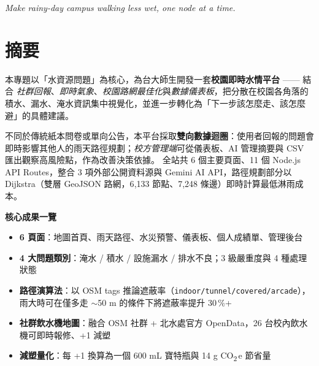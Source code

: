 \documentclass[11pt,a4paper]{article}
\begin{document}
\begin{titlepage}
\vfill


\vspace{0.3cm}
{\color{mute}\small \textit{Make rainy-day campus walking less wet, one node at a time.}}
\vspace{0.5cm}
\end{titlepage}

\section{摘要}

本專題以「水資源問題」為核心，為台大師生開發一套\textbf{校園即時水情平台} —— 結合
\emph{社群回報}、\emph{即時氣象}、\emph{校園路網最佳化}與\emph{數據儀表板}，把分散在校園各角落的積水、漏水、淹水資訊集中視覺化，並進一步轉化為「下一步該怎麼走、該怎麼避」的具體建議。

不同於傳統紙本問卷或單向公告，本平台採取\textbf{雙向數據迴圈}：使用者回報的問題會即時影響其他人的雨天路徑規劃；\emph{校方管理端}可從儀表板、AI 管理摘要與 CSV 匯出觀察高風險點，作為改善決策依據。
全站共 6 個主要頁面、11 個 Node.js API Routes，整合 3 項外部公開資料源與 Gemini AI API，路徑規劃部分以 Dijkstra（雙層 GeoJSON 路網，6{,}133 節點、7{,}248 條邊）即時計算最低淋雨成本。

\begin{infobox}
\textbf{\color{brandDeep}核心成果一覽}
\begin{itemize}
\item \textbf{6 頁面}：地圖首頁、雨天路徑、水災預警、儀表板、個人成績單、管理後台
\item \textbf{4 大問題類別}：淹水 / 積水 / 設施漏水 / 排水不良；3 級嚴重度與 4 種處理狀態
\item \textbf{路徑演算法}：以 OSM tags 推論遮蔽率（\texttt{indoor/tunnel/covered/arcade}），雨大時可在僅多走 $\sim$50 m 的條件下將遮蔽率提升 30\,\%+
\item \textbf{社群飲水機地圖}：融合 OSM 社群 + 北水處官方 OpenData，26 台校內飲水機可即時報修、+1 減塑
\item \textbf{減塑量化}：每 +1 換算為一個 600 mL 寶特瓶與 14 g CO\textsubscript{2}\,e 節省量
\end{itemize}
\end{infobox}
\end{document}

